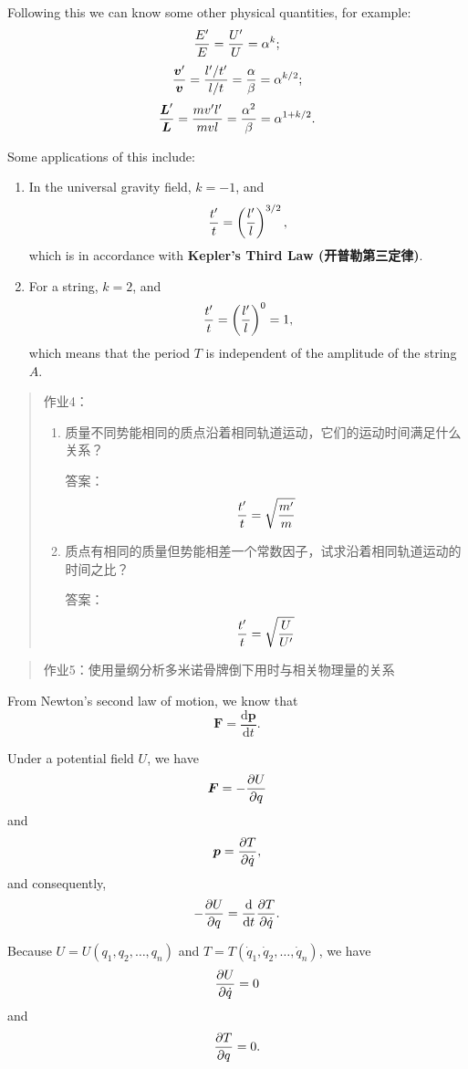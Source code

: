 Following this we can know some other physical quantities, for example:
\[{E' \over E} = {U' \over U} = \alpha^k;\]
\[{\boldsymbol{v}' \over \boldsymbol{v}} = {l'/t' \over l/t} = {\alpha \over \beta} = \alpha^{k/2};\]
\[{\boldsymbol{L}' \over \boldsymbol{L}} = {mv'l' \over mvl} = {\alpha^2 \over \beta} = \alpha^{1 + k/2}.\]

Some applications of this include:

\begin{enumerate}
\def\labelenumi{\arabic{enumi}.}
\item
  In the universal gravity field, \(k = -1\), and
  \[{t' \over t} = \left( {l' \over l} \right)^{3/2},\] which is in
  accordance with \textbf{Kepler's Third Law (开普勒第三定律)}.
\item
  For a string, \(k = 2\), and
  \[{t' \over t} = \left( {l' \over l} \right)^{0} = 1,\] which means
  that the period \(T\) is independent of the amplitude of the string
  \(A\).
\end{enumerate}

\begin{quote}
作业4：

\begin{enumerate}
\def\labelenumi{\arabic{enumi}.}
\item
  质量不同势能相同的质点沿着相同轨道运动，它们的运动时间满足什么关系？

  答案：\[{t' \over t} = \sqrt{m' \over m}\]
\item
  质点有相同的质量但势能相差一个常数因子，试求沿着相同轨道运动的时间之比？

  答案：\[{t' \over t} = \sqrt{U \over U'}\]
\end{enumerate}
\end{quote}

\begin{quote}
作业5：使用量纲分析多米诺骨牌倒下用时与相关物理量的关系
\end{quote}

From Newton's second law of motion, we know that
\[\boldsymbol{F} = \dfrac{\mathrm{d} \boldsymbol{p}}{\mathrm{d}t}.\]

Under a potential field \(U\), we have
\[\boldsymbol{F} = - {\partial U \over \partial q}\] and
\[\boldsymbol{p} = {\partial T \over \partial \dot{q}},\] and
consequently,
\[- {\partial U \over \partial q} = \dfrac{\mathrm{d}}{\mathrm{d}t} {\partial T \over \partial \dot{q}}.\]

Because \(U = U(q_1, q_2, \dots, q_n)\) and
\(T = T(\dot{q}_1, \dot{q}_2, \dots, \dot{q}_n)\), we have
\[{\partial U \over \partial \dot{q}} = 0\] and
\[{\partial T \over \partial q} = 0.\]


